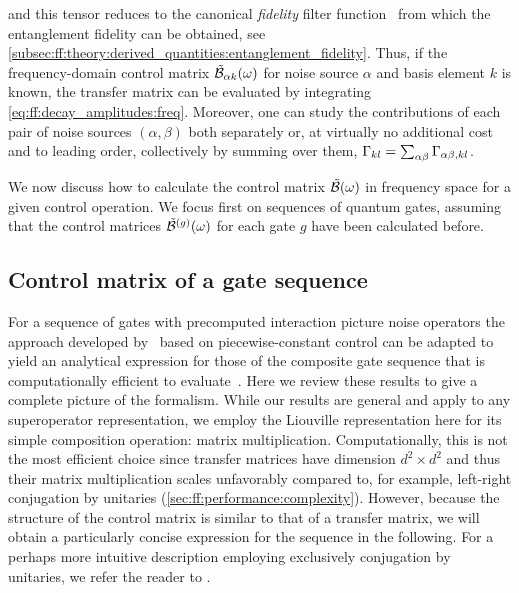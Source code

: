 and this tensor reduces to the canonical \emph{fidelity} filter function~\cite{Green2012} from which the entanglement fidelity can be obtained, see \cref{subsec:ff:theory:derived_quantities:entanglement_fidelity}.
Thus, if the frequency-domain control matrix $\tilde{\mathcal{B}}_{\alpha k}(\omega)$ for noise source $\alpha$ and basis element $k$ is known, the transfer matrix can be evaluated by integrating \cref{eq:ff:decay_amplitudes:freq}.
Moreover, one can study the contributions of each pair of noise sources $(\alpha, \beta)$ both separately or, at virtually no additional cost and to leading order, collectively by summing over them, $\Gamma_{kl} = \sum_{\alpha\beta}\Gamma_{\alpha\beta,kl}$.

We now discuss how to calculate the control matrix $\tilde{\mathcal{B}}(\omega)$ in frequency space for a given control operation.
We focus first on sequences of quantum gates, assuming that the control matrices $\tilde{\mathcal{B}}^{(g)}(\omega)$ for each gate $g$ have been calculated before.

\subsection{Control matrix of a gate sequence}\label{subsec:ff:theory:control_matrix:sequence}
For a sequence of gates with precomputed interaction picture noise operators the approach developed by~\textcite{Green2013} based on piecewise-constant control can be adapted to yield an analytical expression for those of the composite gate sequence that is computationally efficient to evaluate~\cite{Cerfontaine2021}.
Here we review these results to give a complete picture of the formalism.
While our results are general and apply to any superoperator representation, we employ the Liouville representation here for its simple composition operation: matrix multiplication.
Computationally, this is not the most efficient choice since transfer matrices have dimension $d^2\times d^2$ and thus their matrix multiplication scales unfavorably compared to, for example, left-right conjugation by unitaries (\cf \cref{sec:ff:performance:complexity}).
However, because the structure of the control matrix \ctrlmat is similar to that of a transfer matrix,
we will obtain a particularly concise expression for the sequence in the following.
For a perhaps more intuitive description employing exclusively conjugation by unitaries, we refer the reader to .

